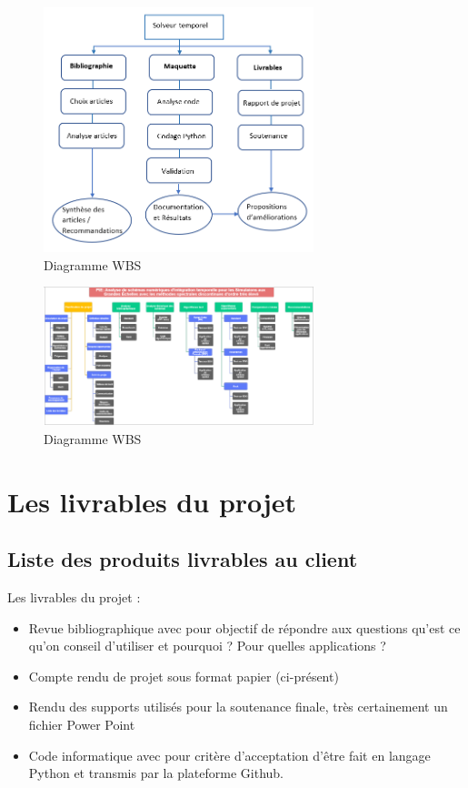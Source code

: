 \documentclass[a4paper,12pt]{report}
\theoremstyle{break}
\begin{document}
\begin{figure}[h]
     \centering
      \includegraphics[width=0.7\textwidth]{images/WBS_detaille.png}
       \caption{Diagramme WBS}
    \label{chaine optim}
\end{figure}
    
  \begin{figure}
     \centering
       \includegraphics[width=0.7\textwidth]{images/WBS.png}
       \caption{Diagramme WBS}
     \label{chaine optim}
  \end{figure}
    
\section{Les livrables du projet}
\subsection{Liste des produits livrables au client}
   Les livrables du projet :
   \begin{itemize}[label=\textbullet]
   	\item Revue bibliographique avec pour objectif de répondre aux questions qu’est ce qu’on conseil d’utiliser et pourquoi ? Pour quelles applications ?
   	\item Compte rendu de projet sous format papier (ci-présent)
   	\item Rendu des supports utilisés pour la soutenance finale, très certainement un fichier Power Point
   	\item  Code informatique avec pour critère d’acceptation d’être fait en langage Python et transmis par la plateforme Github.
    \end{itemize}
\end{document}
